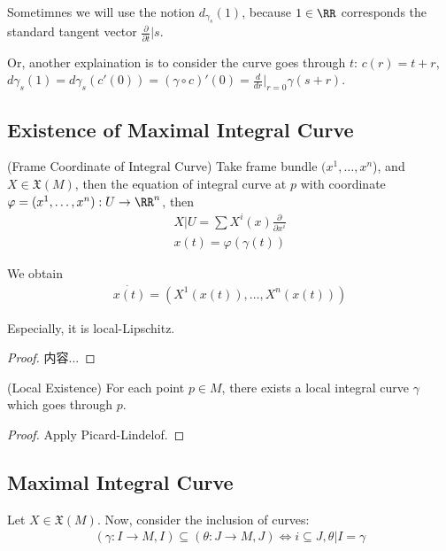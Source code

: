 \documentclass[Total.tex]{subfiles}
\begin{document}
			Sometimnes we will use the notion $d_{\gamma_s}(1)$, because $1\in \RR$ corresponds the standard tangent vector $\frac{\partial}{\partial t}|s$.
			
			Or, another explaination is to consider the curve goes through $t$: $c(r)=t+r$, $d\gamma_s(1)=d\gamma_s(c'(0))=(\gamma\circ c)'(0)=\frac{d}{dr}|_{r=0} \gamma(s+r)$.
		
			\subsection{Existence of Maximal Integral Curve}
					\begin{proposition}
					(Frame Coordinate of Integral Curve) Take frame bundle $(x^1,\dots,x^n$), and $X\in \mathfrak{X}(M)$, then the equation of integral curve at $p$ with coordinate $\varphi=(x^1,\dots,x^n):U\rightarrow \RR^n$, then
					\begin{gather*}
						X|U=\sum X^i(x)\frac{\partial}{\partial x^i}\\
						x(t)=\varphi(\gamma(t))
					\end{gather*}
					
					We obtain
					\begin{gather*}
						\dot{x(t)}=(X^1(x(t)),\dots,X^n(x(t)))
					\end{gather*}
					
					Especially, it is local-Lipschitz. 
				\end{proposition}
				\begin{proof}
					内容...
				\end{proof}
				\begin{proposition}
					(Local Existence) For each point $p\in M$, there exists a local integral curve $\gamma$ which goes through $p$.
				\end{proposition}
				\begin{proof}
					Apply Picard-Lindelof.
				\end{proof}
			\subsection{Maximal Integral Curve}
				\begin{Def}
					Let $X\in \mathfrak{X}(M)$. Now, consider the inclusion of curves:
					\begin{gather*}
						(\gamma:I\rightarrow M,I)\subseteq (\theta:J\rightarrow M,J)\Leftrightarrow i\subseteq J,\theta|I=\gamma
					\end{gather*}
				\end{Def}
				
\end{document}
